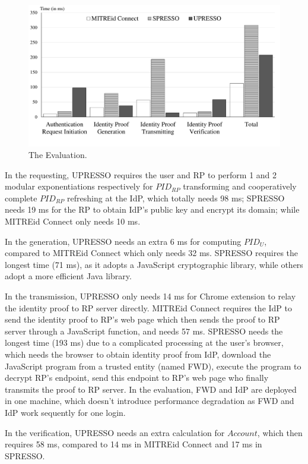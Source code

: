\begin{figure}
  \centering
  \includegraphics[width=\linewidth]{fig/evaluation2.pdf}
  \caption{The Evaluation.}
  \label{fig:evaluation}
\end{figure}

In the requesting, UPRESSO requires the user and RP to perform 1 and 2  modular exponentiations respectively for $PID_{RP}$ transforming and cooperatively complete $PID_{RP}$ refreshing at the IdP, which totally needs 98 ms;  SPRESSO needs 19 ms for the RP to obtain IdP's public key and encrypt its domain; while MITREid Connect only needs 10 ms.

In the generation, UPRESSO needs  an extra 6 ms for computing $PID_U$, compared to MITREid Connect which only needs 32 ms.
SPRESSO requires the longest time (71 ms), as it adopts a JavaScript cryptographic library, while others adopt a more efficient Java library.

In the transmission, UPRESSO only needs 14 ms for Chrome extension to relay the identity proof to RP server directly.
MITREid Connect requires the IdP to send the identity proof to  RP's web page which then sends the proof to RP server through a JavaScript function, and needs 57 ms.
SPRESSO needs the longest time (193 ms) due to a complicated processing at the user's browser,
  which needs the browser to obtain identity proof from IdP, download the JavaScript program from a trusted entity (named FWD), execute the program to decrypt RP's endpoint, send this endpoint to RP's web page who finally transmits the proof to RP server.
In the evaluation,  FWD and IdP are deployed in one machine, which doesn't introduce performance degradation as  FWD and IdP work sequently for one login.



In the verification, UPRESSO needs an extra calculation for $Account$, which then requires  58 ms, compared to 14 ms in MITREid Connect and 17 ms in SPRESSO.



